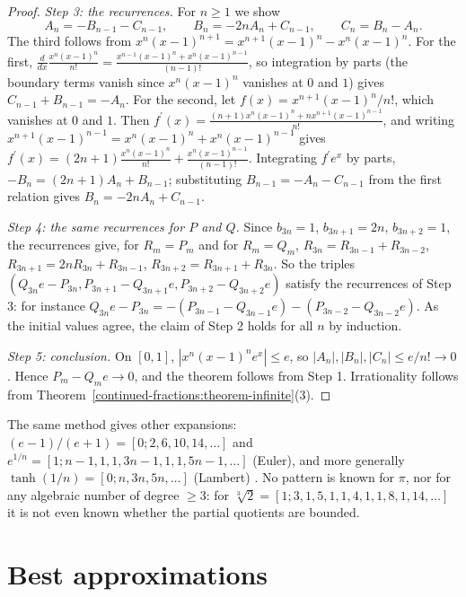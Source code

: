 \begin{proof}
\emph{Step 3: the recurrences.} For $n \geq 1$ we show
\[
A_n = -B_{n-1} - C_{n-1}, \qquad B_n = -2nA_n + C_{n-1}, \qquad C_n = B_n - A_n.
\]
The third follows from $x^n(x - 1)^{n+1} = x^{n+1}(x - 1)^n - x^n(x - 1)^n$. For the first, $\frac{d}{dx}\frac{x^n(x - 1)^n}{n!} = \frac{x^{n-1}(x - 1)^n + x^n(x - 1)^{n-1}}{(n - 1)!}$, so integration by parts
(the boundary terms vanish since $x^n(x - 1)^n$ vanishes at $0$ and $1$) gives $C_{n-1} + B_{n-1} = -A_n$. For the second, let $f(x) = x^{n+1}(x - 1)^n/n!$, which vanishes at $0$ and $1$. Then
$f^{\prime}(x) = \frac{(n + 1)x^n(x - 1)^n + nx^{n+1}(x - 1)^{n-1}}{n!}$, and writing $x^{n+1}(x - 1)^{n-1} = x^n(x - 1)^n + x^n(x - 1)^{n-1}$ gives
$f^{\prime}(x) = (2n + 1)\frac{x^n(x - 1)^n}{n!} + \frac{x^n(x - 1)^{n-1}}{(n - 1)!}$. Integrating $f^{\prime}e^x$ by parts, $-B_n = (2n + 1)A_n + B_{n-1}$; substituting $B_{n-1} = -A_n - C_{n-1}$
from the first relation gives $B_n = -2nA_n + C_{n-1}$.

\emph{Step 4: the same recurrences for $P$ and $Q$.} Since $b_{3n} = 1$, $b_{3n+1} = 2n$, $b_{3n+2} = 1$, the recurrences give, for $R_m = P_m$ and for $R_m = Q_m$,
$R_{3n} = R_{3n-1} + R_{3n-2}$, $R_{3n+1} = 2nR_{3n} + R_{3n-1}$, $R_{3n+2} = R_{3n+1} + R_{3n}$. So the triples $(Q_{3n}e - P_{3n}, P_{3n+1} - Q_{3n+1}e, P_{3n+2} - Q_{3n+2}e)$ satisfy the
recurrences of Step 3: for instance $Q_{3n}e - P_{3n} = -(P_{3n-1} - Q_{3n-1}e) - (P_{3n-2} - Q_{3n-2}e)$. As the initial values agree, the claim of Step 2 holds for all $n$ by induction.

\emph{Step 5: conclusion.} On $[0, 1]$, $|x^n(x - 1)^n e^x| \leq e$, so $|A_n|, |B_n|, |C_n| \leq e/n! \to 0$. Hence $P_m - Q_me \to 0$, and the theorem follows from Step 1. Irrationality follows from
Theorem~\ref{continued-fractions:theorem-infinite}(3).
\end{proof}

\begin{remark}\label{continued-fractions:remark-e-variants}
The same method gives other expansions: $(e - 1)/(e + 1) = [0; 2, 6, 10, 14, \ldots]$ and $e^{1/n} = [1; n - 1, 1, 1, 3n - 1, 1, 1, 5n - 1, \ldots]$ (Euler), and more generally
$\tanh(1/n) = [0; n, 3n, 5n, \ldots]$ (Lambert) \cite{perron-kettenbrueche}. No pattern is known for $\pi$, nor for any algebraic number of degree $\geq 3$: for $\sqrt[3]2 = [1; 3, 1, 5, 1, 1, 4, 1, 1, 8, 1, 14, \ldots]$ it is not even known whether the partial quotients are bounded.
\end{remark}

\section{Best approximations}\label{continued-fractions:section-best}

